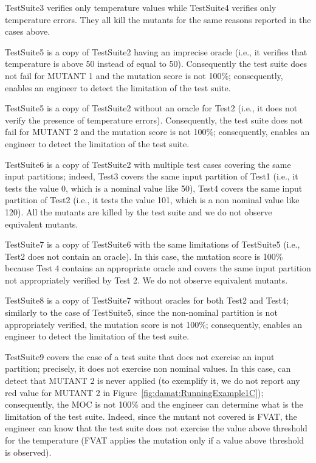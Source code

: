 TestSuite3 verifies only temperature values while TestSuite4 verifies only temperature errors. They all kill the mutants for the same reasons reported in the cases above.

TestSuite5 is a copy of TestSuite2 having an imprecise oracle (i.e., it verifies that temperature is above 50 instead of equal to 50). Consequently the test suite does not fail for MUTANT 1 and the mutation score is not 100\%; consequently, \APPR enables an engineer to detect the limitation of the test suite.

TestSuite5 is a copy of TestSuite2 without an oracle for Test2 (i.e., it does not verify the presence of temperature errors). Consequently, the test suite does not fail for MUTANT 2 and the mutation score is not 100\%; consequently, \APPR enables an engineer to detect the limitation of the test suite.

TestSuite6 is a copy of TestSuite2 with multiple test cases covering the same input partitions; indeed, Test3 covers the same input partition of Test1 (i.e., it tests the value 0, which is a nominal value like 50), Test4 covers the same input partition of Test2 (i.e., it tests the value 101, which is a non nominal value like 120). All the mutants are killed by the test suite and we do not observe equivalent mutants.

TestSuite7 is a copy of TestSuite6 with the same limitations of TestSuite5 (i.e., Test2 does not contain an oracle).
In this case, the mutation score is 100\% because Test 4 contains an appropriate oracle and covers the same input partition not appropriately verified by Test 2. We do not observe equivalent mutants.

TestSuite8 is a copy of TestSuite7 without oracles for both Test2 and Test4; similarly to the case of TestSuite5, since the non-nominal partition is not appropriately verified, the mutation score is not 100\%; consequently, \APPR enables an engineer to detect the limitation of the test suite.

TestSuite9 covers the case of a test suite that does not exercise an input partition; precisely, it does not exercise non nominal values. 
In this case, \APPR can detect that MUTANT 2 is never applied (to exemplify it, we do not report any red value for MUTANT 2 in Figure~\ref{fig:damat:RunningExample1C}); consequently, the MOC is not 100\% and the engineer can determine what is the limitation of the test suite. Indeed, since the mutant not covered is FVAT, the engineer can know that the test suite does not exercise the value above threshold for the temperature (FVAT applies the mutation only if a value above threshold is observed).

